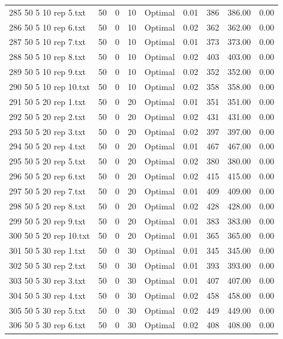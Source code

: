 \begin{longtable}{lrrllrrrr}
285 50 5 10 rep 5.txt & 50 & 0 & 10 & Optimal &  0.01 & 386 & 386.00 &  0.00\\
286 50 5 10 rep 6.txt & 50 & 0 & 10 & Optimal &  0.02 & 362 & 362.00 &  0.00\\
287 50 5 10 rep 7.txt & 50 & 0 & 10 & Optimal &  0.01 & 373 & 373.00 &  0.00\\
288 50 5 10 rep 8.txt & 50 & 0 & 10 & Optimal &  0.02 & 403 & 403.00 &  0.00\\
289 50 5 10 rep 9.txt & 50 & 0 & 10 & Optimal &  0.02 & 352 & 352.00 &  0.00\\
290 50 5 10 rep 10.txt & 50 & 0 & 10 & Optimal &  0.02 & 358 & 358.00 &  0.00\\
291 50 5 20 rep 1.txt & 50 & 0 & 20 & Optimal &  0.01 & 351 & 351.00 &  0.00\\
292 50 5 20 rep 2.txt & 50 & 0 & 20 & Optimal &  0.02 & 431 & 431.00 &  0.00\\
293 50 5 20 rep 3.txt & 50 & 0 & 20 & Optimal &  0.02 & 397 & 397.00 &  0.00\\
294 50 5 20 rep 4.txt & 50 & 0 & 20 & Optimal &  0.01 & 467 & 467.00 &  0.00\\
295 50 5 20 rep 5.txt & 50 & 0 & 20 & Optimal &  0.02 & 380 & 380.00 &  0.00\\
296 50 5 20 rep 6.txt & 50 & 0 & 20 & Optimal &  0.02 & 415 & 415.00 &  0.00\\
297 50 5 20 rep 7.txt & 50 & 0 & 20 & Optimal &  0.01 & 409 & 409.00 &  0.00\\
298 50 5 20 rep 8.txt & 50 & 0 & 20 & Optimal &  0.02 & 428 & 428.00 &  0.00\\
299 50 5 20 rep 9.txt & 50 & 0 & 20 & Optimal &  0.01 & 383 & 383.00 &  0.00\\
300 50 5 20 rep 10.txt & 50 & 0 & 20 & Optimal &  0.01 & 365 & 365.00 &  0.00\\
301 50 5 30 rep 1.txt & 50 & 0 & 30 & Optimal &  0.01 & 345 & 345.00 &  0.00\\
302 50 5 30 rep 2.txt & 50 & 0 & 30 & Optimal &  0.01 & 393 & 393.00 &  0.00\\
303 50 5 30 rep 3.txt & 50 & 0 & 30 & Optimal &  0.01 & 407 & 407.00 &  0.00\\
304 50 5 30 rep 4.txt & 50 & 0 & 30 & Optimal &  0.02 & 458 & 458.00 &  0.00\\
305 50 5 30 rep 5.txt & 50 & 0 & 30 & Optimal &  0.02 & 449 & 449.00 &  0.00\\
306 50 5 30 rep 6.txt & 50 & 0 & 30 & Optimal &  0.02 & 408 & 408.00 &  0.00\\

\end{longtable}
